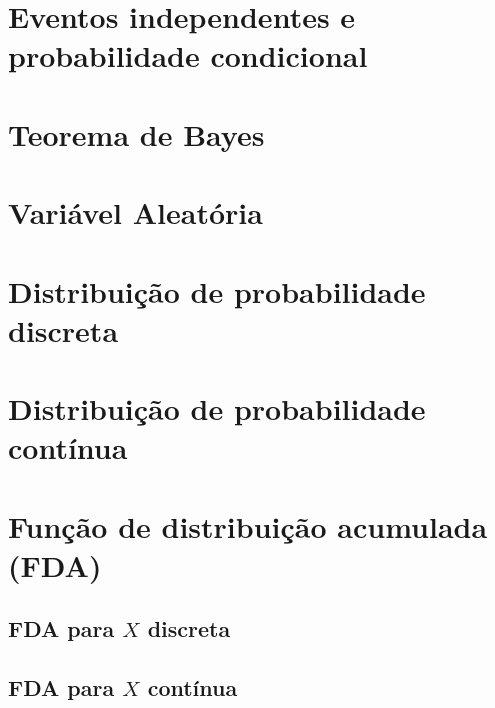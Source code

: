 \documentclass[
]{book}
\begin{document}
\hypertarget{eventos-independentes-e-probabilidade-condicional}{%
\section{Eventos independentes e probabilidade condicional}\label{eventos-independentes-e-probabilidade-condicional}}

\hypertarget{teorema-de-bayes}{%
\section{Teorema de Bayes}\label{teorema-de-bayes}}

\hypertarget{variuxe1vel-aleatuxf3ria}{%
\section{Variável Aleatória}\label{variuxe1vel-aleatuxf3ria}}

\hypertarget{distribuiuxe7uxe3o-de-probabilidade-discreta}{%
\section{Distribuição de probabilidade discreta}\label{distribuiuxe7uxe3o-de-probabilidade-discreta}}

\hypertarget{distribuiuxe7uxe3o-de-probabilidade-contuxednua}{%
\section{Distribuição de probabilidade contínua}\label{distribuiuxe7uxe3o-de-probabilidade-contuxednua}}

\hypertarget{funuxe7uxe3o-de-distribuiuxe7uxe3o-acumulada-fda}{%
\section{Função de distribuição acumulada (FDA)}\label{funuxe7uxe3o-de-distribuiuxe7uxe3o-acumulada-fda}}

\hypertarget{fda-para-x-discreta}{%
\subsection{\texorpdfstring{FDA para \(X\) discreta}{FDA para X discreta}}\label{fda-para-x-discreta}}

\hypertarget{fda-para-x-contuxednua}{%
\subsection{\texorpdfstring{FDA para \(X\) contínua}{FDA para X contínua}}\label{fda-para-x-contuxednua}}
\end{document}
